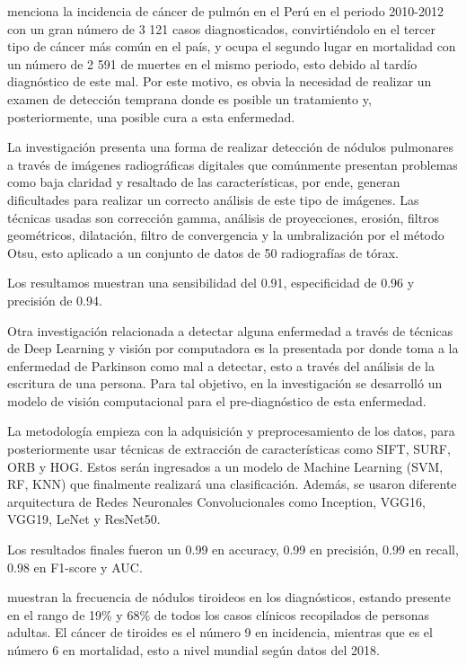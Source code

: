 \cite{pr_supanta2021desalgdetec} menciona la incidencia de cáncer de pulmón en el Perú en el periodo 2010-2012 con un gran número de 3 121 casos diagnosticados, convirtiéndolo en el tercer tipo de cáncer más común en el país, y ocupa el segundo lugar en mortalidad con un número de 2 591 de muertes en el mismo periodo, esto debido al tardío diagnóstico de este mal. Por este motivo, es obvia la necesidad de realizar un examen de detección temprana donde es posible un tratamiento y, posteriormente, una posible cura a esta enfermedad. 

La investigación presenta una forma de realizar detección de nódulos pulmonares a través de imágenes radiográficas digitales que comúnmente presentan problemas como baja claridad y resaltado de las características, por ende, generan dificultades para realizar un correcto análisis de este tipo de imágenes. Las técnicas usadas son corrección gamma, análisis de proyecciones, erosión, filtros geométricos, dilatación, filtro de convergencia y la umbralización por el método Otsu, esto aplicado a un conjunto de datos de 50 radiografías de tórax.

Los resultamos muestran una sensibilidad del 0.91, especificidad de 0.96 y precisión de 0.94. 

Otra investigación relacionada a detectar alguna enfermedad a través de técnicas de Deep Learning y visión por computadora es la presentada por \cite{pr_monroy2021disvc} donde toma a la enfermedad de Parkinson como mal a detectar, esto a través del análisis de la escritura de una persona. Para tal objetivo, en la investigación se desarrolló un modelo de visión computacional para el pre-diagnóstico de esta enfermedad.

La metodología empieza con la adquisición y preprocesamiento de los datos, para posteriormente usar técnicas de extracción de características como SIFT, SURF, ORB y HOG. Estos serán ingresados a un modelo de Machine Learning (SVM, RF, KNN) que finalmente realizará una clasificación. Además, se usaron diferente arquitectura de Redes Neuronales Convolucionales como Inception, VGG16, VGG19, LeNet y ResNet50.

Los resultados finales fueron un 0.99 en accuracy, 0.99 en precisión, 0.99 en recall, 0.98 en F1-score y AUC.

\cite{pr_kang2022thysegclass} muestran la frecuencia de nódulos tiroideos en los diagnósticos, estando presente en el rango de 19\% y 68\% de todos los casos clínicos recopilados de personas adultas. El cáncer de tiroides es el número 9 en incidencia, mientras que es el número 6 en mortalidad, esto a nivel mundial según datos del 2018.

